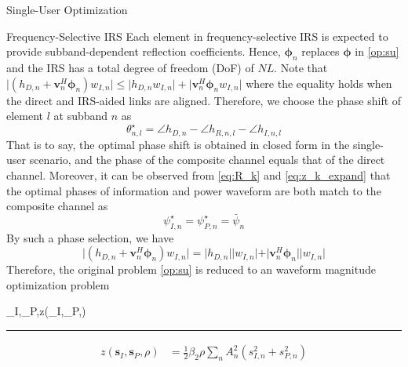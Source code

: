 \documentclass{IEEEtran}
\begin{document}
\begin{section}{Single-User Optimization}
	\begin{subsection}{Frequency-Selective IRS}
		Each element in frequency-selective IRS is expected to provide subband-dependent reflection coefficients. Hence, $\boldsymbol{\phi}_n$ replaces $\boldsymbol{\phi}$ in \ref{op:su} and the IRS has a total degree of freedom (DoF) of $NL$. Note that $\lvert{(h_{D,n}+\boldsymbol{v}_n^H\boldsymbol{\phi}_n)w_{I,n}}\rvert \le \lvert{h_{D,n}w_{I,n}}\rvert+\lvert{\boldsymbol{v}_n^H\boldsymbol{\phi}_n w_{I,n}}\rvert$ where the equality holds when the direct and IRS-aided links are aligned. Therefore, we choose the phase shift of element $l$ at subband $n$ as
		\begin{equation}\label{eq:theta}
			\theta_{n,l}^\star = \angle{h}_{D,n} - \angle{h_{R,n,l}}-\angle{h_{I,n,l}}
		\end{equation}
		That is to say, the optimal phase shift is obtained in closed form in the single-user scenario, and the phase of the composite channel equals that of the direct channel. Moreover, it can be observed from \ref{eq:R_k} and \ref{eq:z_k_expand} that the optimal phases of information and power waveform are both match to the composite channel as
		\begin{equation}\label{eq:psi}
			\psi_{I,n}^{\star}=\psi_{P,n}^{\star}=\bar{\psi}_{n}
		\end{equation}
		By such a phase selection, we have
		\begin{equation}
			\lvert{(h_{D,n}+\boldsymbol{v}_n^H\boldsymbol{\phi}_n)w_{I,n}}\rvert = \lvert h_{D,n} \rvert \lvert w_{I,n} \rvert + \vert \boldsymbol{v}_n^H\boldsymbol{\phi}_n \rvert \lvert w_{I,n} \rvert
		\end{equation}
		Therefore, the original problem \ref{op:su} is reduced to an waveform magnitude optimization problem
		\begin{maxi!}
				{\boldsymbol{s}_I,_P,\rho}{z(\boldsymbol{s}_I,_P,\rho)}{\label{op:su_gp}}{}
			\end{maxi!}
		\begin{figure*}[b]
			\hrule
			\begin{equation}\label{eq:z_gp}
				\begin{split}
					z(\boldsymbol{s}_I,\boldsymbol{s}_P,\rho)
					&=\frac{1}{2}{\beta_2}{\rho}\sum_n{A_n^2(s_{I,n}^2+s_{P,n}^2)}\\

\end{split}
\end{equation}
\end{figure*}
\end{subsection}
\end{section}
\end{document}
